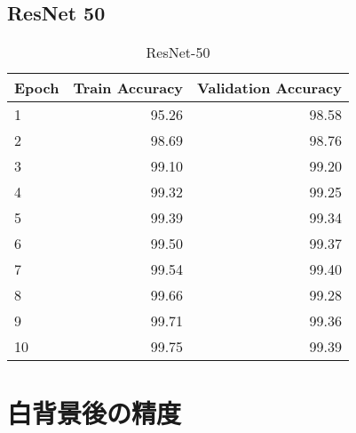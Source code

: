 \documentclass[a4paper,11pt,titlepage]{jsarticle}
\begin{document}
\subsection{ResNet 50}

\begin{table}[H]
\centering
\caption{ResNet-50}
\label{tab:ResNet50}
\begin{tabular}{lrr}
\hline
 Epoch &  Train Accuracy &  Validation Accuracy \\
\hline
     1 &           95.26 &                98.58 \\
     2 &           98.69 &                98.76 \\
     3 &           99.10 &                99.20 \\
     4 &           99.32 &                99.25 \\
     5 &           99.39 &                99.34 \\
     6 &           99.50 &                99.37 \\
     7 &           99.54 &                99.40 \\
     8 &           99.66 &                99.28 \\
     9 &           99.71 &                99.36 \\
    10 &           99.75 &                99.39 \\
\hline
\end{tabular}
\end{table}


\section{白背景後の精度}
\end{document}
